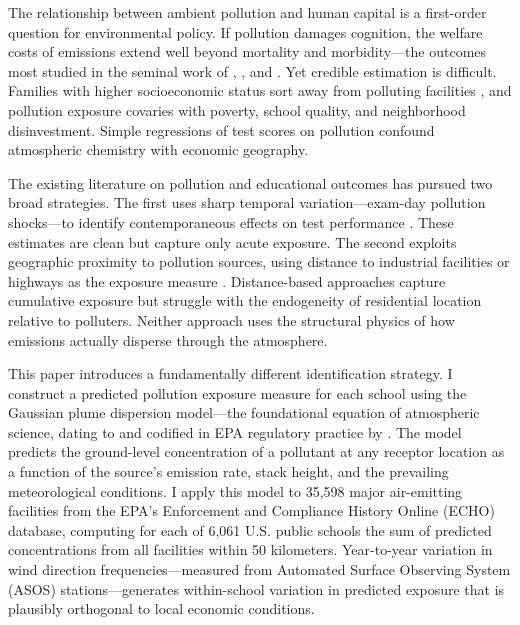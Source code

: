 \documentclass[12pt]{article}
\begin{document}
The relationship between ambient pollution and human capital is a first-order question for environmental policy. If pollution damages cognition, the welfare costs of emissions extend well beyond mortality and morbidity---the outcomes most studied in the seminal work of \citet{chay2003}, \citet{deryugina2019}, and \citet{currie2009}. Yet credible estimation is difficult. Families with higher socioeconomic status sort away from polluting facilities \citep{currie2014}, and pollution exposure covaries with poverty, school quality, and neighborhood disinvestment. Simple regressions of test scores on pollution confound atmospheric chemistry with economic geography.

The existing literature on pollution and educational outcomes has pursued two broad strategies. The first uses sharp temporal variation---exam-day pollution shocks---to identify contemporaneous effects on test performance \citep{ebenstein2016}. These estimates are clean but capture only acute exposure. The second exploits geographic proximity to pollution sources, using distance to industrial facilities or highways as the exposure measure \citep{persico2021, knittel2016}. Distance-based approaches capture cumulative exposure but struggle with the endogeneity of residential location relative to polluters. Neither approach uses the structural physics of how emissions actually disperse through the atmosphere.

This paper introduces a fundamentally different identification strategy. I construct a predicted pollution exposure measure for each school using the Gaussian plume dispersion model---the foundational equation of atmospheric science, dating to \citet{pasquill1961} and codified in EPA regulatory practice by \citet{turner1994}. The model predicts the ground-level concentration of a pollutant at any receptor location as a function of the source's emission rate, stack height, and the prevailing meteorological conditions. I apply this model to 35,598 major air-emitting facilities from the EPA's Enforcement and Compliance History Online (ECHO) database, computing for each of 6,061 U.S. public schools the sum of predicted concentrations from all facilities within 50 kilometers. Year-to-year variation in wind direction frequencies---measured from Automated Surface Observing System (ASOS) stations---generates within-school variation in predicted exposure that is plausibly orthogonal to local economic conditions.
\end{document}
